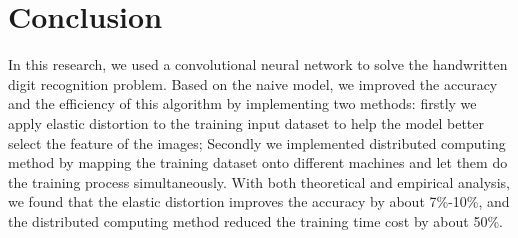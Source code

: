 
\section{Conclusion}
\label{Conclusion}
In this research, we used a convolutional neural network to solve the handwritten digit recognition problem. Based on the naive model, we improved the accuracy and the efficiency of this algorithm by implementing two methods: firstly we apply elastic distortion to the training input dataset to help the model better select the feature of the images; Secondly we implemented distributed computing method by mapping the training dataset onto different machines and let them do the training process simultaneously. With both theoretical and empirical analysis, we found that the elastic distortion improves the accuracy by about 7\%-10\%, and the distributed computing method reduced the training time cost by about 50\%. 


